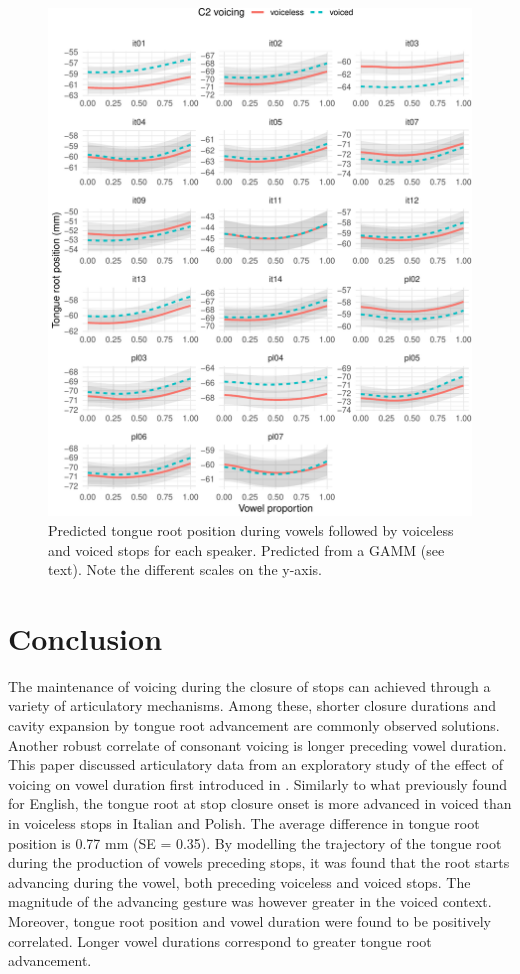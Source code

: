 \documentclass[12pt,]{article}
\begin{document}
\begin{figure}
\includegraphics[width=\linewidth]{2018-tra_files/figure-latex/tra-gam-s-ar-plot-1} \caption{Predicted tongue root position during vowels followed by voiceless and voiced stops for each speaker. Predicted from a GAMM (see text). Note the different scales on the y-axis.}\label{f:tra-gam-s-ar-plot}
\end{figure}

\hypertarget{conclusion}{%
\section{Conclusion}\label{conclusion}}

The maintenance of voicing during the closure of stops can achieved
through a variety of articulatory mechanisms. Among these, shorter
closure durations and cavity expansion by tongue root advancement are
commonly observed solutions. Another robust correlate of consonant
voicing is longer preceding vowel duration. This paper discussed
articulatory data from an exploratory study of the effect of voicing on
vowel duration first introduced in \citet{coretta2018j}. Similarly to
what previously found for English, the tongue root at stop closure onset
is more advanced in voiced than in voiceless stops in Italian and
Polish. The average difference in tongue root position is 0.77 mm (SE =
0.35). By modelling the trajectory of the tongue root during the
production of vowels preceding stops, it was found that the root starts
advancing during the vowel, both preceding voiceless and voiced stops.
The magnitude of the advancing gesture was however greater in the voiced
context. Moreover, tongue root position and vowel duration were found to
be positively correlated. Longer vowel durations correspond to greater
tongue root advancement.
\end{document}

